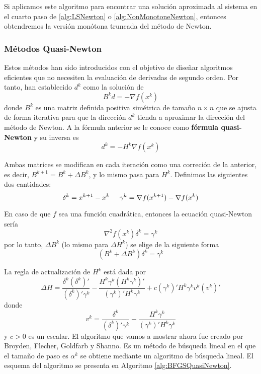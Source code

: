 Si aplicamos este algoritmo para encontrar una solución aproximada al sistema en el cuarto paso de \ref{alg:LSNewton} o \ref{alg:NonMonotoneNewton}, entonces obtendremos la versión monótona truncada del método de Newton.

\subsubsection{Métodos Quasi-Newton}

Estos métodos han sido introducidos con el objetivo de diseñar algoritmos eficientes que no necesiten la evaluación de derivadas de segundo orden. 
Por tanto, han establecido $d^k$ como la solución de 
\begin{equation}
B^kd = -\nabla f(x^k)
\label{eq:4.27}
\end{equation}
donde $B^k$ es una matriz definida positiva simétrica de tamaño $n\times n$ que se ajusta de forma iterativa para que la dirección $d^k$ tienda a aproximar la dirección del método de Newton. 
A la fórmula anterior se le conoce como \textbf{fórmula quasi-Newton} y su inversa es
\begin{equation}
d^k = - H^k\nabla f(x^k)
\label{eq:4.28}
\end{equation}

Ambas matrices se modifican en cada iteración como una correción de la anterior, es decir, $B^{k+1} = B^k + \Delta B^k$, y lo mismo pasa para $H^k$. 
Definimos las siguientes dos cantidades:
\begin{equation*}
\delta^k = x^{k+1} - x^k \hspace{0.5cm} \gamma^k = \nabla f(x^{k+1}) - \nabla f(x^k)
\end{equation*}

En caso de que $f$ sea una función cuadrática, entonces la ecuación quasi-Newton sería
\begin{equation}
\nabla^2 f(x^k)\delta^k = \gamma^k
\label{eq:4.29}
\end{equation}
por lo tanto, $\Delta B^k$ (lo mismo para $\Delta H^k$) se elige de la siguiente forma
\begin{equation}
(B^k + \Delta B^k)\delta^k = \gamma^k
\label{eq:4.30}
\end{equation}

La regla de actualización de $H^k$ está dada por
\begin{equation}
\Delta H = \dfrac{\delta^k(\delta^k)'}{(\delta^k)'\gamma^k} - \dfrac{H^k\gamma^k(H^k\gamma^k)'}{(\gamma^k)'H^k\gamma^k} + c(\gamma^k)'H^k\gamma^kv^k(v^k)'
\label{eq:4.31}
\end{equation}
donde
\begin{equation*}
v^k = \dfrac{\delta^k}{(\delta^k)'\gamma^k} - \dfrac{H^k\gamma^k}{(\gamma^k)'H^k\gamma^k}
\end{equation*}
y $c>0$ es un escalar. 
El algoritmo que vamos a mostrar ahora fue creado por Broyden, Flecher, Goldfarb y Shanno. 
Es un método de búsqueda lineal en el que el tamaño de paso es $\alpha^k$ se obtiene mediante un algoritmo de búsqueda lineal. 
El esquema del algoritmo se presenta en Algoritmo \ref{alg:BFGSQuasiNewton}.

